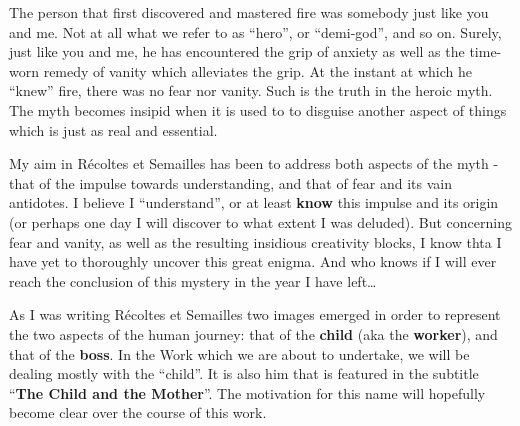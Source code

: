 The person that first discovered and mastered fire was somebody just like you and me. 
Not at all what we refer to as ``hero'', or ``demi-god'', and so on.  
Surely, just like you and me, he has encountered the grip of anxiety as well as the 
time-worn remedy of vanity which alleviates the grip.
At the instant at which he ``knew'' fire, there was no fear nor vanity. 
Such is the truth in the heroic myth. 
The myth becomes insipid when it is used to
to disguise another aspect of things which is just as real and essential. 

My aim in R\'ecoltes et Semailles has been to address both aspects of the myth - that of
the impulse towards understanding, and that of fear and its vain antidotes. 
I believe I ``understand'', or at least \textbf{know} this impulse and its origin (or
perhaps one day I will discover to what extent I was deluded). 
But concerning fear and vanity, as well as the resulting insidious creativity blocks, 
I know thta I have yet to thoroughly uncover this great enigma. 
And who knows if I will ever reach the conclusion of this mystery in the year I have
left\ldots

As I was writing 
R\'ecoltes et Semailles 
two images emerged in order to represent the two aspects of the human journey:
that of the \textbf{child} (aka the \textbf{worker}), and that of the
\textbf{boss}.
In the Work which we are about to undertake, we will be dealing mostly with the ``child''.
It is also him that is featured in the subtitle ``\textbf{The Child and the Mother}''. 
The motivation for this name 
will hopefully become clear over the course of this work.

